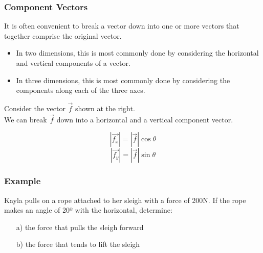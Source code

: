 \documentclass{article}
\begin{document}
\subsubsection{Component Vectors}
It is often convenient to break a vector down into one or more vectors that together comprise the original vector.

\begin{itemize}
    \item In two dimensions, this is most commonly done by considering the horizontal and vertical components of a vector.  
    \item In three dimensions, this is most commonly done by considering the components along each of the three axes.
\end{itemize}

\begin{minipage}[h]{0.4\textwidth}
    Consider the vector $\vec{f}$ shown at the right.\\
    We can break $\vec{f}$ down into a horizontal and a vertical component vector.\\
\end{minipage}
\begin{minipage}[t]{0.3\textwidth}
    \[
    |\overrightarrow{f_x}| = |\overrightarrow{f}| \cos \theta
    \]
    \[
    |\overrightarrow{f_y}| = |\overrightarrow{f}| \sin \theta
    \]
\end{minipage}


\subsubsection*{Example}
Kayla pulls on a rope attached to her sleigh with a force of 200N. If the rope makes an angle of 20º with the horizontal, determine:
\begin{enumerate}
    \item[a)] the force that pulls the sleigh forward
    \item[b)] the force that tends to lift the sleigh
\end{enumerate}
\end{document}
